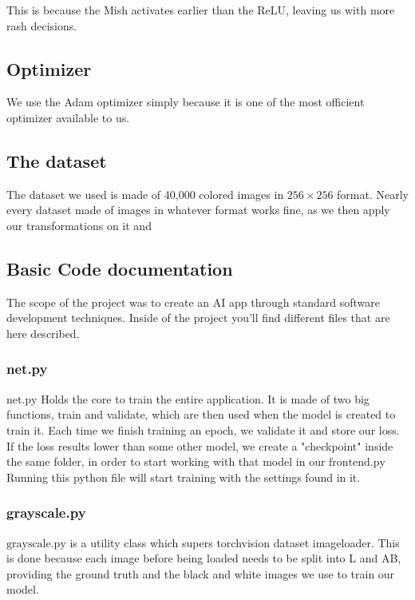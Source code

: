 \documentclass{article}
\begin{document}
This is because the Mish activates earlier than the ReLU, leaving us with more rash
decisions. 

\subsection{Optimizer}
We use the Adam optimizer simply because it is one of the most officient optimizer 
available to us.  

\subsection{The dataset}
The dataset we used is made of 40,000 colored images in $256 \times 256$ format.
Nearly every dataset made of images in whatever format works fine, as we then apply
our transformations on it and 


\subsection{Basic Code documentation}
The scope of the project was to create an AI app through standard 
software development techniques. Inside of the project you'll find
different files that are here described. 

\subsubsection{net.py}
$\text{net.py}$ Holds the core to train the entire application. It is made of two 
big functions, train and validate, which are then used when the model is created to 
train it. Each time we finish training an epoch, we validate it and store our loss. 
If the loss results lower than some other model, we create a "checkpoint" inside the 
same folder, in order to start working with that model in our $\text{frontend.py}$ 
Running this python file will start training with the settings found 
in it. 

\subsubsection{grayscale.py}
$\text{grayscale.py}$ is a utility class which supers torchvision dataset imageloader. 
This is done because each image before being loaded needs to be split into L and AB, 
providing the ground truth and the black and white images we use to train our model. 
\end{document}
